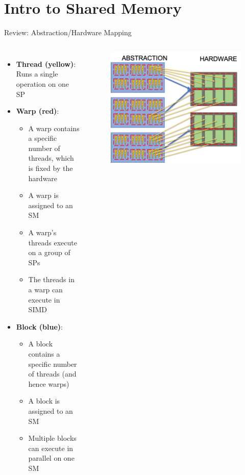 \documentclass{beamer}
\begin{document}
    \section{Intro to Shared Memory}

    \begin{frame}{Review: Abstraction/Hardware Mapping}
        \begin{columns}
            {\footnotesize
            \begin{itemize}
                \item \textbf{Thread (yellow)}: Runs a single operation on one SP
                \item \textbf{Warp (red)}:
                \begin{itemize}
                    \item A warp contains a specific number of threads, which is fixed by the hardware
                    \item A warp is assigned to an SM
                    \item A warp's threads execute on a group of SPs
                    \item The threads in a warp can execute in SIMD
                \end{itemize}
                \item \textbf{Block (blue)}:
                \begin{itemize}
                    \item A block contains a specific number of threads (and hence warps)
                    \item A block is assigned to an SM
                    \item Multiple blocks can execute in parallel on one SM
                \end{itemize}
            \end{itemize}
            }
            \begin{figure}
                \centering
                \includegraphics[width=\textwidth]{img/03/gpu-hard-abs.png}

\end{figure}
\end{columns}
\end{frame}
\end{document}
